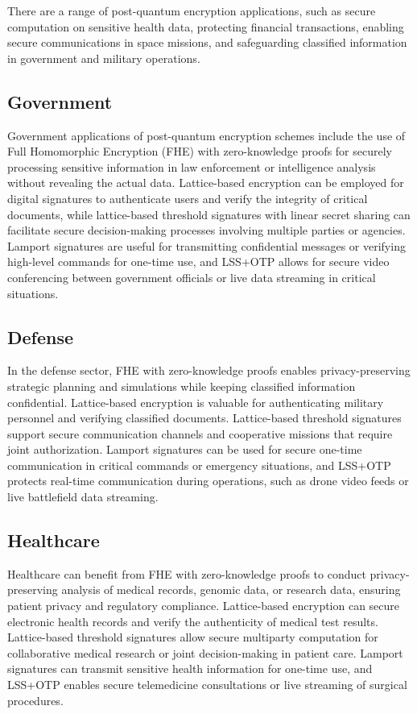 \documentclass[11pt]{article}
\begin{document}
There are a range of post-quantum encryption applications, such as secure computation on sensitive health data, protecting financial transactions, enabling secure communications in space missions, and safeguarding classified information in government and military operations.


\subsection{Government}

Government applications of post-quantum encryption schemes include the use of Full Homomorphic Encryption (FHE) with zero-knowledge proofs for securely processing sensitive information in law enforcement or intelligence analysis without revealing the actual data. Lattice-based encryption can be employed for digital signatures to authenticate users and verify the integrity of critical documents, while lattice-based threshold signatures with linear secret sharing can facilitate secure decision-making processes involving multiple parties or agencies. Lamport signatures are useful for transmitting confidential messages or verifying high-level commands for one-time use, and LSS+OTP allows for secure video conferencing between government officials or live data streaming in critical situations.


\subsection{Defense}

In the defense sector, FHE with zero-knowledge proofs enables privacy-preserving strategic planning and simulations while keeping classified information confidential. Lattice-based encryption is valuable for authenticating military personnel and verifying classified documents. Lattice-based threshold signatures support secure communication channels and cooperative missions that require joint authorization. Lamport signatures can be used for secure one-time communication in critical commands or emergency situations, and LSS+OTP protects real-time communication during operations, such as drone video feeds or live battlefield data streaming.


\subsection{Healthcare}

Healthcare can benefit from FHE with zero-knowledge proofs to conduct privacy-preserving analysis of medical records, genomic data, or research data, ensuring patient privacy and regulatory compliance. Lattice-based encryption can secure electronic health records and verify the authenticity of medical test results. Lattice-based threshold signatures allow secure multiparty computation for collaborative medical research or joint decision-making in patient care. Lamport signatures can transmit sensitive health information for one-time use, and LSS+OTP enables secure telemedicine consultations or live streaming of surgical procedures.
\end{document}

